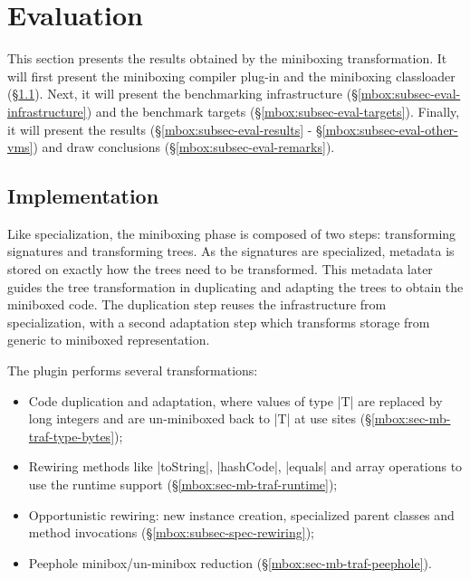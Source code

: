\section{Evaluation}
\label{mbox:sec-evaluation}

\newcommand{\sctx}[0]{Single Context}
\newcommand{\mctx}[0]{Multi Context}
\newcommand{\bn}[1]{\textbf{#1}}
\newcommand{\opt}[1]{#1}

This section presents the results obtained by the miniboxing transformation. It will first present the miniboxing compiler plug-in and the miniboxing classloader (\S\ref{mbox:subsec-eval-impl}). Next, it will present the benchmarking infrastructure (\S\ref{mbox:subsec-eval-infrastructure}) and the benchmark targets (\S\ref{mbox:subsec-eval-targets}). Finally, it will present the results (\S\ref{mbox:subsec-eval-results} - \S\ref{mbox:subsec-eval-other-vms}) and draw conclusions (\S\ref{mbox:subsec-eval-remarks}).

\subsection{Implementation}
\label{mbox:subsec-eval-impl}

 Like specialization, the miniboxing phase is composed of two steps: transforming signatures and transforming trees. As the signatures are specialized, metadata is stored on exactly how the trees need to be transformed. This metadata later guides the tree transformation in duplicating and adapting the trees to obtain the miniboxed code. The duplication step reuses the infrastructure from specialization, with a second adaptation step which transforms storage from generic to miniboxed representation.   

The plugin performs several transformations:
\begin{itemize}
\item Code duplication and adaptation, where values of type |T| are replaced by long integers and are un-miniboxed back to |T| at use sites (\S\ref{mbox:sec-mb-traf-type-bytes});
\item Rewiring methods like |toString|, |hashCode|, |equals| and array operations to use the runtime support (\S\ref{mbox:sec-mb-traf-runtime});
\item Opportunistic rewiring: new instance creation, specialized parent classes and method invocations (\S\ref{mbox:subsec-spec-rewiring});
\item Peephole minibox/un-minibox reduction (\S\ref{mbox:sec-mb-traf-peephole}).
\end{itemize}
 
